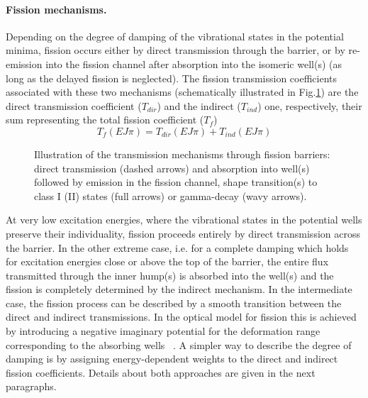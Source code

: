 \paragraph*{Fission mechanisms.}

Depending on the degree of damping of the vibrational states in the
potential minima, fission occurs either by direct transmission through the
barrier, or by re-emission into the fission channel after absorption into
the isomeric well(s) (as long as the delayed fission is neglected). The
fission transmission coefficients associated with these two mechanisms
(schematically illustrated in Fig.\ref{fis-mech}) are the direct
transmission coefficient ($T_{dir}$) and the indirect ($T_{ind}$) one,
respectively, their sum representing the total fission coefficient ($T_{f}$)
\begin{equation}
T_{f}(EJ\pi)=T_{dir}(EJ\pi)+T_{ind}(EJ\pi)  \label{tf}
\end{equation}
\begin{figure}[htbp]
\caption{Illustration of the transmission mechanisms through fission
barriers: direct transmission (dashed arrows) and absorption into well(s)
followed by emission in the fission channel, shape transition(s) to class I
(II) states (full arrows) or gamma-decay (wavy arrows).}
\label{fis-mech}
\end{figure}
At very low excitation energies, where the vibrational states in the
potential wells preserve their individuality, fission proceeds entirely by
direct transmission across the barrier. In the other extreme case, i.e. for
a complete damping which holds for excitation energies close or above the
top of the barrier, the entire flux transmitted through the inner hump(s) is
absorbed into the well(s) and the fission is completely determined by the
indirect mechanism. In the intermediate case, the fission process can be
described by a smooth transition between the direct and indirect
transmissions. In the optical model for fission this is achieved by
introducing a negative imaginary potential for the deformation range
corresponding to the absorbing wells ~\cite{Bhandari:79, Back:74}. A simpler
way to describe the degree of damping is by assigning energy-dependent
weights to the direct and indirect fission coefficients. Details about both
approaches are given in the next paragraphs.


